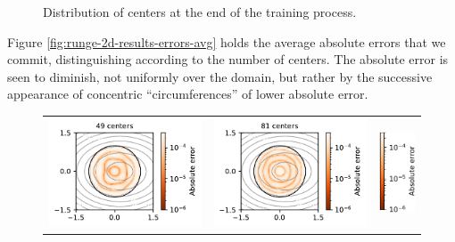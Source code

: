\documentclass[12pt]{report} %
\begin{document}
\begin{figure}
\begin{tabular}{cc}
  \end{tabular}
  \caption{Distribution of centers at the end of the training process.}
  \label{fig:runge-2d-results-centers}
\end{figure}

Figure \ref{fig:runge-2d-results-errors-avg} holds the average absolute errors that we commit, distinguishing according to the number of centers. The absolute error is seen to diminish, not uniformly over the domain, but rather by the successive appearance of concentric ``circumferences'' of lower absolute error.

\begin{figure}
  \hspace*{-.5cm}
  \begin{tabular}{ccl}
    {\includegraphics[width=.4\textwidth, clip=true,trim={0 0 2.1cm 0}]{imagenes/experiments/2d/statistical_2d_full_scheduler_interpolation/runge_2d/runge_2d_49.pdf}}                    &
    \includegraphics[width=.4\textwidth, clip=true,trim={0 0 2.1cm 0}]{imagenes/experiments/2d/statistical_2d_full_scheduler_interpolation/runge_2d/runge_2d_81.pdf}                      & \multirow{3}{*}{\includegraphics[width=.15\textwidth]{imagenes/experiments/2d/statistical_2d_full_scheduler_interpolation/runge_2d/colorbar_runge_averages.pdf}}    \\

\end{tabular}
\end{figure}
\end{document}
